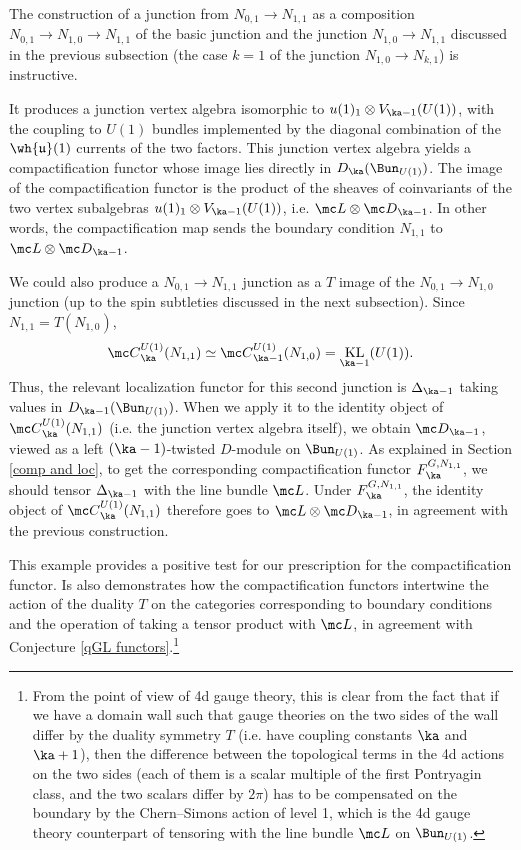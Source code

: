 \documentclass[11pt,reqno]{amsart}
\theoremstyle{plain}
\numberwithin{equation}{section}
\DeclareMathOperator{\KL}{KL}
\theoremstyle{definition}
\begin{document}
\medskip

The construction of a junction from $N_{0,1} \to N_{1,1}$ as a
composition $N_{0,1} \to N_{1,0} \to N_{1,1}$ of the basic junction
and the junction $N_{1,0} \to N_{1,1}$ discussed in the previous
subsection (the case $k=1$ of the junction $N_{1,0} \to N_{k,1}$) is
instructive. 

It produces a junction vertex algebra isomorphic to $u(1)_1 \otimes
V_{\ka-1}(U(1))$, with the coupling to $U(1)$ bundles implemented by
the diagonal combination of the $\wh{\mathfrak{u}}(1)$ currents of the
two factors. This junction vertex algebra yields a compactification
functor whose image lies directly in $D_{\ka}(\Bun_{U(1)})$. The image
of the compactification functor is the product of the sheaves of
coinvariants of the two vertex subalgebras $u(1)_1 \otimes
V_{\ka-1}(U(1))$, i.e. ${\mc L} \otimes {\mc D}_{\ka-1}$. In other
words, the compactification map sends the boundary condition $N_{1,1}$
to ${\mc L} \otimes {\mc D}_{\ka-1}$.

We could also produce a $N_{0,1} \to N_{1,1}$ junction as a $T$
image of the $N_{0,1} \to N_{1,0}$ junction (up to the spin subtleties
discussed in the next subsection).  Since $N_{1,1} = T(N_{1,0})$,
$$
{\mc C}^{U(1)}_\ka(N_{1,1}) \simeq {\mc C}^{U(1)}_{\ka-1}(N_{1,0}) =
\KL_{\ka-1}(U(1)).
$$
Thus, the relevant localization functor for this second junction is
$\Delta_{\ka-1}$ taking values in $D_{\ka-1}(\Bun_{U(1)})$. When we
apply it to the identity object of ${\mc C}^{U(1)}_\ka(N_{1,1})$
(i.e. the junction vertex algebra itself), we obtain ${\mc
  D}_{\ka-1}$, viewed as a left $(\ka-1)$-twisted $D$-module on
$\Bun_{U(1)}$. As explained in Section \ref{comp and loc}, to get the
corresponding compactification functor $F^{G,N_{1,1}}_\ka$, we should
tensor $\Delta_{\ka-1}$ with the line bundle ${\mc L}$. Under
$F^{G,N_{1,1}}_\ka$, the identity object of ${\mc
  C}^{U(1)}_\ka(N_{1,1})$ therefore goes to ${\mc L} \otimes {\mc
  D}_{\ka-1}$, in agreement with the previous construction.

This example provides a positive test for our prescription for the compactification functor. 
Is also demonstrates how the compactification functors intertwine the action of the
duality $T$ on the categories corresponding to boundary conditions and
the operation of taking a tensor product with ${\mc L}$, in agreement
with Conjecture \ref{qGL functors}.\footnote{From the point of view of 4d gauge
theory, this is clear from the fact that if we have a domain wall such
that gauge theories on the two sides of the wall differ by the duality
symmetry $T$ (i.e. have coupling constants $\ka$ and $\ka+1$), then
the difference between the topological terms in the 4d actions on the
two sides (each of them is a scalar multiple of the first Pontryagin
class, and the two scalars differ by $2\pi$) has to be compensated on
the boundary by the Chern--Simons action of level 1, which is the 4d
gauge theory counterpart of tensoring with the line bundle ${\mc L}$
on $\Bun_{U(1)}$.}
\end{document}
